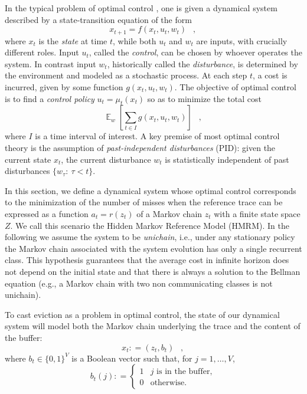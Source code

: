 \documentclass[11pt,a4paper]{article}
\DeclareMathOperator{\E}{\mathbb{E}}
\DeclareMathOperator{\mc}{\enspace ,}
\newcommand{\deq}{\mathrel{\mathop:}=}
\theoremstyle{definition}
\theoremstyle{remark}
\begin{document}
In the typical problem of optimal control \cite{Bertsekas00}, one is given a
dynamical system described by a state-transition equation of the form
\begin{equation}\label{eqn:xtransition}
  x_{t+1}=f(x_t,u_t,w_t) \mc
\end{equation} 
where $x_t$ is the \emph{state} at time $t$, while both $u_t$ and $w_t$ are
inputs, with crucially different roles. Input $u_t$, called the \emph{control},
can be chosen by whoever operates the system.  In contrast input $w_t$,
historically called the \emph{disturbance}, is determined by the environment and
modeled as a stochastic process. At each step $t$, a cost is incurred, given by
some function $g(x_t,u_t,w_t)$. The objective of optimal control is to find a
\emph{control policy} $u_t=\mu_t(x_t)$ so as to minimize the total cost
\begin{equation}
  \E_w \left[ \sum_{t \in I} g(x_t,u_t,w_t) \right] \mc
\end{equation} 
where $I$ is a time interval of interest.  A key premise of most optimal control
theory is the assumption of \emph{past-independent disturbances} (PID): given the
current state $x_t$, the current disturbance $w_t$ is statistically independent
of past disturbances $\{w_{\tau}:~\tau <t\}$.

In this section, we define a dynamical system whose optimal control
corresponds to the minimization of the number of misses when the
reference trace can be expressed as a function $a_t=r(z_t)$ of a
Markov chain $z_t$ with a finite state space $Z$.  We call this
scenario the Hidden Markov Reference Model (HMRM).
In the following we assume the system to be \emph{unichain}, i.e., under any
stationary policy the Markov chain associated with the system evolution has only
a single recurrent class. This hypothesis guarantees that the average cost in
infinite horizon does not depend on the initial state and that there is always a
solution to the Bellman equation (e.g., a Markov chain with two non
communicating classes is not unichain).

To cast eviction as a problem in optimal control, the state of our
dynamical system will model both the Markov chain underlying the trace
and the content of the buffer:
\begin{equation}
  x_t \deq (z_t, b_t) \mc
\end{equation}
where $b_t\in\{0,1\}^V$ is a Boolean vector such that, for $j=1,
\ldots, V$,
\begin{equation}
  b_t(j) \deq
  \begin{cases}
    1 & j \text{ is in the buffer},\\
    0 & \text{otherwise}.
  \end{cases}
\end{equation}
\end{document}
